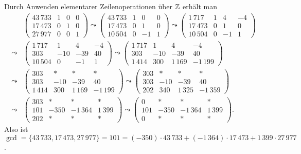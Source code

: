 \documentclass[../../main.tex]{subfiles}
\begin{document}
\begin{bsp}\label{16.3.3}
Durch Anwenden elementarer Zeilenoperationen über $\mathbb Z$ erhält man
\begin{align*}
&\begin{pmatrix*}43\,733 & 1 & 0 & 0\\ 17\, 473 & 0 & 1 & 0\\ 27\,977 & 0 & 0 & 1\end{pmatrix*}\leadsto \begin{pmatrix*}43\,733 & 1 & 0 & 0\\ 17\, 473 & 0 & 1 & 0\\ 10\,504 & 0 & -1 & 1\end{pmatrix*}\leadsto \begin{pmatrix*}1\,717 & 1 & 4 & -4\\ 17\, 473 & 0 & 1 & 0\\ 10\,504 & 0 & -1 & 1\end{pmatrix*}\\
\leadsto&\begin{pmatrix*}1\,717 & 1 & 4 & -4\\ 303 & -10 & -39 & 40\\ 10\,504 & 0 & -1 & 1\end{pmatrix*}\leadsto\begin{pmatrix*}1\,717 & 1 & 4 & -4\\ 303 & -10 & -39 & 40\\ 1\,414 & 300 & 1\,169 & -1\,199\end{pmatrix*}\\
\leadsto&\begin{pmatrix*}303 & * & * & *\\ 303 & -10 & -39 & 40\\ 1\,414 & 300 & 1\,169 & -1\,199\end{pmatrix*}\leadsto \begin{pmatrix*}303 & * & * & *\\ 303 & -10 & -39 & 40\\ 202 & 340 & 1\,325 & -1\,359\end{pmatrix*}\\
\leadsto&\begin{pmatrix*}303 & * & * & *\\ 101 & -350 & -1\,364 & 1\,399\\ 202 & * & * & *\end{pmatrix*}\leadsto\begin{pmatrix*}0 & * & * & *\\ 101 & -350 & -1\,364 & 1\,399\\ 0 & * & * & *\end{pmatrix*}.
\end{align*}
Also ist $\gcd=\{43\,733,17\, 473,27\,977\}=101=(-350)\cdot 43\,733+(-1\,364)\cdot 17\, 473+1\,399\cdot 27\,977$.
\end{bsp}
\end{document}
